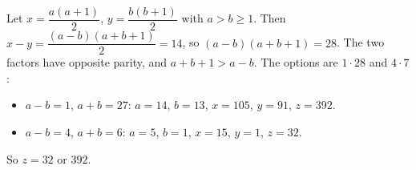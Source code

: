 Let $x=\dfrac{a(a+1)}2$, $y=\dfrac{b(b+1)}2$ with $a>b\ge1$. Then $x-y=\dfrac{(a-b)(a+b+1)}2=14$, so $(a-b)(a+b+1)=28$. The two factors have opposite parity, and $a+b+1>a-b$. The options are $1\cdot28$ and $4\cdot7$:
\begin{itemize}
\item $a-b=1$, $a+b=27$: $a=14$, $b=13$, $x=105$, $y=91$, $z=392$.
\item $a-b=4$, $a+b=6$: $a=5$, $b=1$, $x=15$, $y=1$, $z=32$.
\end{itemize}
So $z=\boxed{32\text{ or }392}$.
